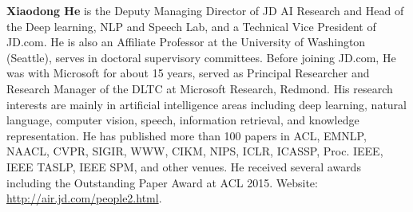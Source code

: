 {\bfseries Xiaodong He} is the Deputy Managing Director of JD
AI Research and Head of the Deep learning, NLP
and Speech Lab, and a Technical Vice President of
JD.com. He is also an Affiliate Professor at the University
of Washington (Seattle), serves in doctoral supervisory
committees. Before joining JD.com, He was
with Microsoft for about 15 years, served as Principal
Researcher and Research Manager of the DLTC
at Microsoft Research, Redmond. His research interests
are mainly in artificial intelligence areas including
deep learning, natural language, computer vision,
speech, information retrieval, and knowledge representation.
He has published more than 100 papers in ACL,
EMNLP, NAACL, CVPR, SIGIR, WWW, CIKM, NIPS,
ICLR, ICASSP, Proc. IEEE, IEEE TASLP, IEEE SPM,
and other venues. He received several awards including
the Outstanding Paper Award at ACL 2015. Website:
\url{http://air.jd.com/people2.html}.




